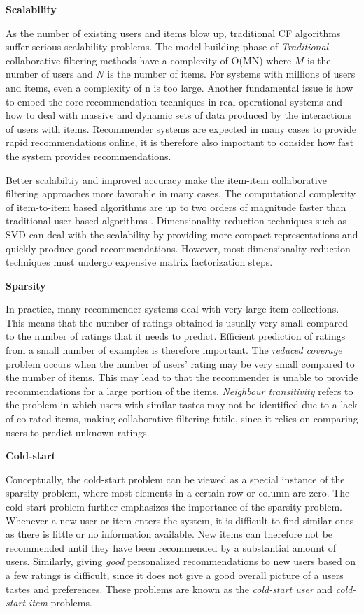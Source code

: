 \textbf{Scalability}

As the number of existing users and items blow up, traditional CF algorithms suffer serious scalability problems. The model building phase of \emph{Traditional} collaborative filtering methods have a complexity of O(MN) where $M$ is the number of users and $N$ is the number of items. For systems with millions of users and items, even a complexity of n is too large. Another fundamental issue is how to embed the core recommendation techniques in real operational systems and how to deal with massive and dynamic sets of data produced by the interactions of users with items. Recommender systems are expected in many cases to provide rapid recommendations online, it is therefore also important to consider how fast the system provides recommendations.

Better scalabiltiy and improved accuracy make the item-item collaborative filtering approaches more favorable in many cases. The computational complexity of item-to-item based algorithms are up to two orders of magnitude faster than traditional user-based algorithms \cite{Deshpande2004}. Dimensionality reduction techniques such as SVD can deal with the scalability by providing more compact representations and quickly produce good recommendations. However, most dimensionalty reduction techniques must undergo expensive matrix factorization steps.

\textbf{Sparsity}

In practice, many recommender systems deal with very large item collections. This means that the number of ratings obtained is usually very small compared to the number of ratings that it needs to predict. Efficient prediction of ratings from a small number of examples is therefore important. The \emph{reduced coverage} problem occurs when the number of users' rating may be very small compared to the number of items. This may lead to that the recommender is unable to provide recommendations for a large portion of the items. \emph{Neighbour transitivity} refers to the problem in which users with similar tastes may not be identified due to a lack of co-rated items, making collaborative filtering futile, since it relies on comparing users to predict unknown ratings.

\textbf{Cold-start}

Conceptually, the cold-start problem can be viewed as a special instance of the sparsity problem, where most elements in a certain row or column are zero. The cold-start problem further emphasizes the importance of the sparsity problem. Whenever a new user or item enters the system, it is difficult to find similar ones as there is little or no information available. New items can therefore not be recommended until they have been recommended by a substantial amount of users. Similarly, giving \emph{good} personalized recommendations to new users based on a few ratings is difficult, since it does not give a good overall picture of a users tastes and preferences. These problems are known as the \emph{cold-start user} and \emph{cold-start item} problems.

